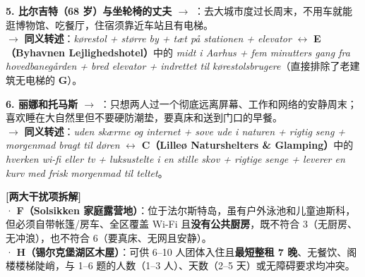 \begin{transbox}
\textbf{5. 比尔吉特（68 岁）与坐轮椅的丈夫 $\rightarrow$ }：去大城市度过长周末，不用车就能逛博物馆、吃餐厅，住宿须靠近车站且有电梯。\\
$\rightarrow$ \textbf{同义转述}：\textit{kørestol + større by + tæt på stationen + elevator} $\leftrightarrow$ \textbf{E（Byhavnen Lejlighedshotel）}中的 \textit{midt i Aarhus + fem minutters gang fra hovedbanegården + bred elevator + indrettet til kørestolsbrugere}（直接排除了老建筑无电梯的 \textbf{G}）。

\textbf{6. 丽娜和托马斯 $\rightarrow$ }：只想两人过一个彻底远离屏幕、工作和网络的安静周末；喜欢睡在大自然里但不要硬防潮垫，要真床和送到门口的早餐。\\
$\rightarrow$ \textbf{同义转述}：\textit{uden skærme og internet + sove ude i naturen + rigtig seng + morgenmad bragt til døren} $\leftrightarrow$ \textbf{C（Lilleø Naturshelters \& Glamping）}中的 \textit{hverken wi-fi eller tv + luksustelte i en stille skov + rigtige senge + leverer en kurv med frisk morgenmad til teltet}。

\vspace{0.35em}
\textbf{\color{NCDRed}[两大干扰项拆解]}\\
· \textbf{F（Solsikken 家庭露营地）}：位于法尔斯特岛，虽有户外泳池和儿童迪斯科，但必须自带帐篷/房车、全区覆盖 Wi-Fi 且\textbf{没有公共厨房}，既不符合 3（无厨房、无冲浪），也不符合 6（要真床、无网且安静）。\\
· \textbf{H（锡尔克堡湖区木屋）}：可供 6--10 人团体入住且\textbf{最短整租 7 晚}、无餐饮、阁楼楼梯陡峭，与 1--6 题的人数（1--3 人）、天数（2--5 天）或无障碍要求均冲突。
\end{transbox}

